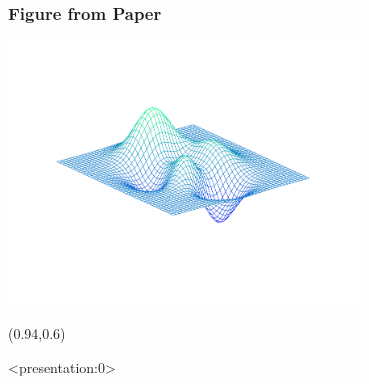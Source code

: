 \documentclass[12pt,aspectratio=169,xcolor=dvipsnames,hyperref={colorlinks=true,linkcolor=blue,citecolor=black}]{beamer}
\begin{document}
\begin{frame}[label=figureex]
	\frametitle{Figure from Paper}
	\begin{center}
		\includegraphics[trim={0cm 0cm 0cm 1cm},clip,height=7cm,width=\textwidth,keepaspectratio]{../Figures/exfigure1}
	\end{center}
	
	\begin{textblock*}{3cm}(0.94\textwidth,0.6\textheight)	%
		\hyperlink{examples}{}
	\end{textblock*}
\end{frame}

\begin{frame}<presentation:0>								%
	 
	
\end{frame}
\end{document}
